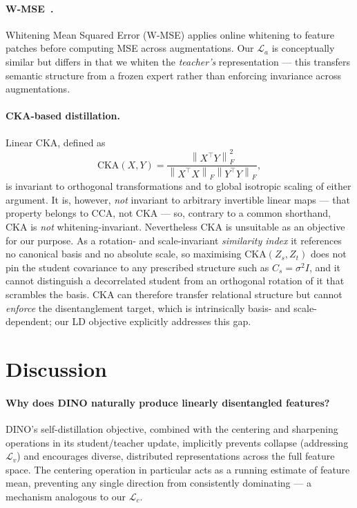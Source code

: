 \documentclass[11pt,a4paper]{article}
\newcommand{\calL}{\mathcal{L}}
\newcommand{\norm}[1]{\left\|#1\right\|}
\begin{document}
\paragraph{W-MSE~\citep{ermolov2021whitening}.}
Whitening Mean Squared Error (W-MSE) applies online whitening to feature
patches before computing MSE across augmentations.  Our $\calL_a$ is
conceptually similar but differs in that we whiten the \emph{teacher's}
representation — this transfers semantic structure from a frozen expert rather
than enforcing invariance across augmentations.

\paragraph{CKA-based distillation.}
Linear CKA, defined as
\[
    \text{CKA}(X,Y) = \frac{\norm{X^\top Y}_F^2}{\norm{X^\top X}_F \norm{Y^\top Y}_F},
\]
is invariant to orthogonal transformations and to global isotropic scaling of
either argument.  It is, however, \emph{not} invariant to arbitrary invertible
linear maps — that property belongs to CCA, not CKA — so, contrary to a common
shorthand, CKA is \emph{not} whitening-invariant.
Nevertheless CKA is unsuitable as an objective for our purpose.  As a rotation-
and scale-invariant \emph{similarity index} it references no canonical basis and
no absolute scale, so maximising $\text{CKA}(Z_s, Z_t)$ does not pin the student
covariance to any prescribed structure such as $C_s = \sigma^2 I$, and it cannot
distinguish a decorrelated student from an orthogonal rotation of it that
scrambles the basis.  CKA can therefore transfer relational structure but cannot
\emph{enforce} the disentanglement target, which is intrinsically basis- and
scale-dependent; our LD objective explicitly addresses this gap.

\section{Discussion}
\label{sec:discussion}

\paragraph{Why does DINO naturally produce linearly disentangled features?}
DINO's self-distillation objective, combined with the centering and sharpening
operations in its student/teacher update, implicitly prevents collapse
(addressing $\calL_v$) and encourages diverse, distributed representations
across the full feature space.  The centering operation in particular acts as a
running estimate of feature mean, preventing any single direction from
consistently dominating — a mechanism analogous to our $\calL_c$.
\end{document}
